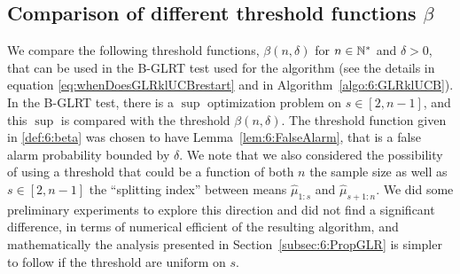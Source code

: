 \subsection{Comparison of different threshold functions $\beta$}\label{sec:6:exploringDifferentThresholdFunctions}

%

We compare the following threshold functions, $\beta(n,\delta)$ for $n\in\mathbb{N}^*$ and $\delta>0$, that can be used in the B-GLRT test used for the \GLRklUCB{} algorithm (see the details in equation \eqref{eq:whenDoesGLRklUCBrestart} and in Algorithm~\ref{algo:6:GLRklUCB}).
%
In the B-GLRT test, there is a $\sup$ optimization problem on $s\in[2,n-1]$, and this $\sup$ is compared with the threshold $\beta(n,\delta)$. The threshold function given in \eqref{def:6:beta} was chosen to have Lemma~\ref{lem:6:FalseAlarm}, that is a false alarm probability bounded by $\delta$.
%
We note that we also considered the possibility of using a threshold that could be a function of both $n$ the sample size as well as $s\in[2,n-1]$ the ``splitting index'' between means $\widehat{\mu}_{1:s}$ and $\widehat{\mu}_{s+1:n}$.
We did some preliminary experiments to explore this direction and did not find a significant difference, in terms of numerical efficient of the resulting \GLRklUCB{} algorithm, and mathematically the analysis presented in Section~\ref{subsec:6:PropGLR} is simpler to follow if the threshold are uniform on $s$.


